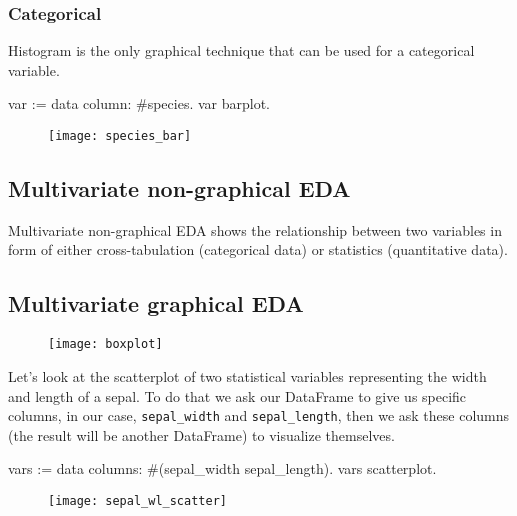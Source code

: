 \documentclass{article}
\begin{document}
\begin{multicols}{2}
\subsubsection{Categorical}

Histogram is the only graphical technique that can be used for a categorical variable.

\begin{code}{}
var := data column: #species.
var barplot.
\end{code}

\begin{figure}[H]
  \begin{center}
  \texttt{[image: species\_bar]}
  \end{center}
\end{figure}

\subsection{Multivariate non-graphical EDA}
Multivariate non-graphical EDA shows the relationship between two variables in form of either cross-tabulation (categorical data) or statistics (quantitative data).

\subsection{Multivariate graphical EDA}
\begin{figure}[H]
  \begin{center}
  \texttt{[image: boxplot]}
  \end{center}
\end{figure}

Let's look at the scatterplot of two statistical variables representing the width and length of a sepal. To do that we ask our DataFrame to give us specific columns, in our case, \texttt{sepal\_width} and \texttt{sepal\_length}, then we ask these columns (the result will be another DataFrame) to visualize themselves.

\begin{code}{}
vars := data columns: #(sepal_width sepal_length).
vars scatterplot.
\end{code}

\begin{figure}[H]
  \begin{center}
  \texttt{[image: sepal\_wl\_scatter]}
  \end{center}
\end{figure}


\end{multicols}
\end{document}
